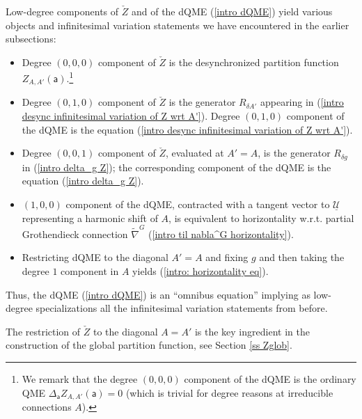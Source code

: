 \documentclass[11pt,a4paper]{amsart}
\theoremstyle{plain} %
\theoremstyle{definition}
\theoremstyle{remark}
\newcommand{\sfa}{\mathsf{a}}
\newcommand{\til}{\widetilde}
\newcommand{\mc}{\mathcal}
\newcommand{\UU}{\underline{\mc{U}}}
\begin{document}
Low-degree components of $\check{Z}$ and of the dQME (\ref{intro dQME}) yield various objects and infinitesimal variation statements we have encountered in the earlier subsections:
\begin{itemize}
    \item Degree $(0,0,0)$ component of $\check{Z}$ is the desynchronized partition function $Z_{A,A'}(\sfa)$.\footnote{We remark that the degree $(0,0,0)$ component of the dQME is the ordinary QME $\Delta_\sfa Z_{A,A'}(\sfa)=0$ (which is trivial for degree reasons at irreducible connections $A$).}
    \item Degree $(0,1,0)$ component of $\check{Z}$ is the generator $R_{\delta A'}$ appearing in (\ref{intro desync infinitesimal variation of Z wrt A'}). Degree $(0,1,0)$ component of the dQME is the equation (\ref{intro desync infinitesimal variation of Z wrt A'}).
    \item Degree $(0,0,1)$ component of $\check{Z}$, evaluated at $A'=A$, is the generator $R_{\delta g}$ in (\ref{intro delta_g Z}); the corresponding component of the dQME is the equation (\ref{intro delta_g Z}).
    \item $(1,0,0)$ component of the dQME, contracted with a tangent vector to $\UU$ representing a harmonic shift of $A$, is equivalent to horizontality w.r.t. partial Grothendieck connection $\til{\nabla}^G$ (\ref{intro til nabla^G horizontality}).
    \item Restricting dQME to the diagonal $A'=A$ and fixing $g$ and then taking the degree $1$ component in $A$ yields (\ref{intro: horizontality eq}).
\end{itemize}

Thus, the dQME (\ref{intro dQME}) is an ``omnibus equation'' implying as low-degree specializations all the infinitesimal variation statements from before.

The restriction of $\check{Z}$ to the diagonal $A=A'$ is the key ingredient in the construction of the global partition function, see Section \ref{ss Zglob}.


\end{document}

